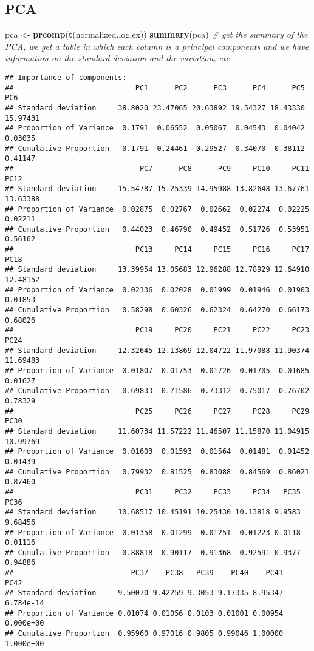 \documentclass[
]{article}
\newenvironment{Shaded}{\begin{snugshade}}{\end{snugshade}}
\newcommand{\CommentTok}[1]{\textcolor[rgb]{0.56,0.35,0.01}{\textit{#1}}}
\newcommand{\FunctionTok}[1]{\textcolor[rgb]{0.13,0.29,0.53}{\textbf{#1}}}
\newcommand{\NormalTok}[1]{#1}
\newcommand{\OtherTok}[1]{\textcolor[rgb]{0.56,0.35,0.01}{#1}}
\begin{document}
\subsection{PCA}\label{pca}

\begin{Shaded}
\begin{Highlighting}[]
\NormalTok{pca }\OtherTok{\textless{}{-}} \FunctionTok{prcomp}\NormalTok{(}\FunctionTok{t}\NormalTok{(normalized.log.ex))}
\FunctionTok{summary}\NormalTok{(pca) }\CommentTok{\# get the summary of the PCA, we get a table in which each column is a principal components and we have information on the standard deviation and the variation, etc}
\end{Highlighting}
\end{Shaded}

\begin{verbatim}
## Importance of components:
##                            PC1      PC2      PC3      PC4      PC5      PC6
## Standard deviation     38.8020 23.47065 20.63892 19.54327 18.43330 15.97431
## Proportion of Variance  0.1791  0.06552  0.05067  0.04543  0.04042  0.03035
## Cumulative Proportion   0.1791  0.24461  0.29527  0.34070  0.38112  0.41147
##                             PC7      PC8      PC9     PC10     PC11     PC12
## Standard deviation     15.54787 15.25339 14.95988 13.82648 13.67761 13.63388
## Proportion of Variance  0.02875  0.02767  0.02662  0.02274  0.02225  0.02211
## Cumulative Proportion   0.44023  0.46790  0.49452  0.51726  0.53951  0.56162
##                            PC13     PC14     PC15     PC16     PC17     PC18
## Standard deviation     13.39954 13.05683 12.96288 12.78929 12.64910 12.48152
## Proportion of Variance  0.02136  0.02028  0.01999  0.01946  0.01903  0.01853
## Cumulative Proportion   0.58298  0.60326  0.62324  0.64270  0.66173  0.68026
##                            PC19     PC20     PC21     PC22     PC23     PC24
## Standard deviation     12.32645 12.13869 12.04722 11.97088 11.90374 11.69483
## Proportion of Variance  0.01807  0.01753  0.01726  0.01705  0.01685  0.01627
## Cumulative Proportion   0.69833  0.71586  0.73312  0.75017  0.76702  0.78329
##                            PC25     PC26     PC27     PC28     PC29     PC30
## Standard deviation     11.60734 11.57222 11.46507 11.15870 11.04915 10.99769
## Proportion of Variance  0.01603  0.01593  0.01564  0.01481  0.01452  0.01439
## Cumulative Proportion   0.79932  0.81525  0.83088  0.84569  0.86021  0.87460
##                            PC31     PC32     PC33     PC34   PC35    PC36
## Standard deviation     10.68517 10.45191 10.25430 10.13818 9.9583 9.68456
## Proportion of Variance  0.01358  0.01299  0.01251  0.01223 0.0118 0.01116
## Cumulative Proportion   0.88818  0.90117  0.91368  0.92591 0.9377 0.94886
##                           PC37    PC38   PC39    PC40    PC41      PC42
## Standard deviation     9.50070 9.42259 9.3053 9.17335 8.95347 6.784e-14
## Proportion of Variance 0.01074 0.01056 0.0103 0.01001 0.00954 0.000e+00
## Cumulative Proportion  0.95960 0.97016 0.9805 0.99046 1.00000 1.000e+00
\end{verbatim}
\end{document}
